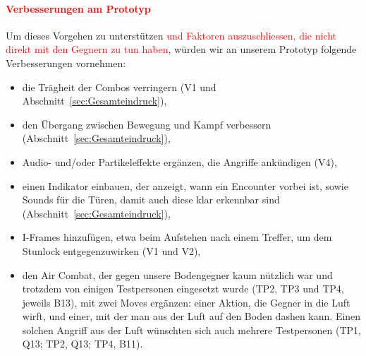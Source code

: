 \documentclass[../Main.tex]{subfiles}
\begin{document}
\paragraph{\textcolor{red}{Verbesserungen am Prototyp}}
Um dieses Vorgehen zu unterstützen \textcolor{red}{und Faktoren auszuschliessen, die nicht direkt mit den Gegnern zu tun haben}, würden wir an unserem Prototyp folgende Verbesserungen vornehmen:

\begin{itemize}[leftmargin=1.5cm]
    \item die Trägheit der Combos verringern (V1 und Abschnitt~\ref{sec:Gesamteindruck}),
    \item den Übergang zwischen Bewegung und Kampf verbessern (Abschnitt~\ref{sec:Gesamteindruck}),
    \item Audio- und/oder Partikeleffekte ergänzen, die Angriffe ankündigen (V4),
    \item einen Indikator einbauen, der anzeigt, wann ein Encounter vorbei ist, sowie Sounds für die Türen, damit auch diese klar erkennbar sind (Abschnitt~\ref{sec:Gesamteindruck}),
    \item I-Frames hinzufügen, etwa beim Aufstehen nach einem Treffer, um dem Stunlock entgegenzuwirken (V1 und V2),
    \item den Air Combat, der gegen unsere Bodengegner kaum nützlich war und trotzdem von einigen Testpersonen eingesetzt wurde (TP2, TP3 und TP4, jeweils B13), mit zwei Moves ergänzen: einer Aktion, die Gegner in die Luft wirft, und einer, mit der man aus der Luft auf den Boden dashen kann. Einen solchen Angriff aus der Luft wünschten sich auch mehrere Testpersonen (TP1, Q13; TP2, Q13; TP4, B11).
\end{itemize}
\end{document}
